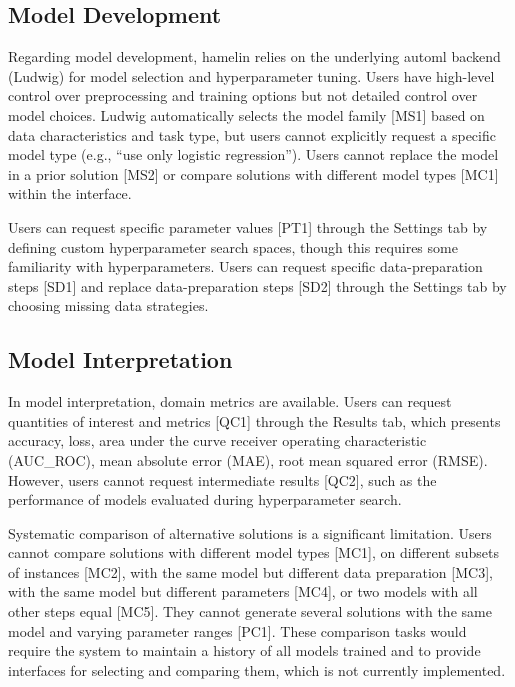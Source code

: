 \documentclass[conference,twocolumn]{IEEEtran}
\begin{document}
\subsection{Model Development}
  
Regarding model development, \gls{hamelin} relies on the underlying \gls{automl} backend (Ludwig) for model selection and hyperparameter tuning. Users have high-level control over preprocessing and training options but not detailed control over model choices. Ludwig automatically selects the model family [MS1] based on data characteristics and task type, but users cannot explicitly request a specific model type (e.g., ``use only logistic regression''). Users cannot replace the model in a prior solution [MS2] or compare solutions with different model types [MC1] within the interface.
  
Users can request specific parameter values [PT1] through the Settings tab by defining custom hyperparameter search spaces, though this requires some familiarity with hyperparameters. Users can request specific data-preparation steps [SD1] and replace data-preparation steps [SD2] through the Settings tab by choosing missing data strategies.
  
\subsection{Model Interpretation}
  
In model interpretation, domain metrics are available. Users can request quantities of interest and metrics [QC1] through the Results tab, which presents accuracy, loss, area under the curve receiver operating characteristic (AUC\_ROC), mean absolute error (MAE), root mean squared error (RMSE). However, users cannot request intermediate results [QC2], such as the performance of models evaluated during hyperparameter search.
  
Systematic comparison of alternative solutions is a significant limitation. Users cannot compare solutions with different model types [MC1], on different subsets of instances [MC2], with the same model but different data preparation [MC3], with the same model but different parameters [MC4], or two models with all other steps equal [MC5]. They cannot generate several solutions with the same model and varying parameter ranges [PC1]. These comparison tasks would require the system to maintain a history of all models trained and to provide interfaces for selecting and comparing them, which is not currently implemented.
\end{document}
